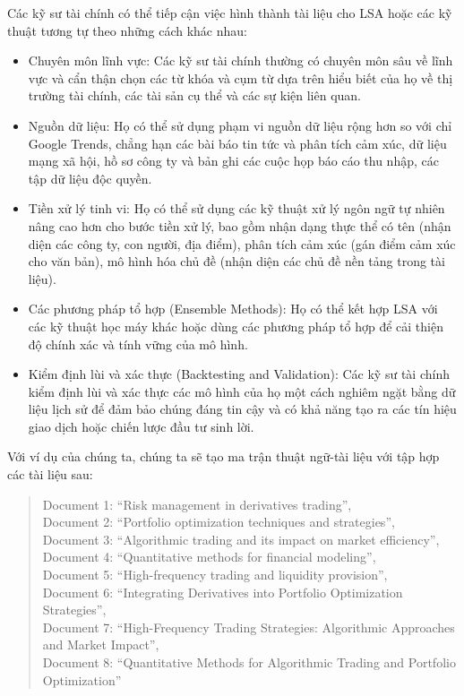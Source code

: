 Các kỹ sư tài chính có thể tiếp cận việc hình thành tài liệu cho LSA hoặc các kỹ thuật tương tự theo những cách khác nhau:

\begin{itemize}
  \item Chuyên môn lĩnh vực: Các kỹ sư tài chính thường có chuyên môn sâu về lĩnh vực và cẩn thận chọn các từ khóa và cụm từ dựa trên hiểu biết của họ về thị trường tài chính, các tài sản cụ thể và các sự kiện liên quan.

  \item Nguồn dữ liệu: Họ có thể sử dụng phạm vi nguồn dữ liệu rộng hơn so với chỉ Google Trends, chẳng hạn các bài báo tin tức và phân tích cảm xúc, dữ liệu mạng xã hội, hồ sơ công ty và bản ghi các cuộc họp báo cáo thu nhập, các tập dữ liệu độc quyền.

  \item Tiền xử lý tinh vi: Họ có thể sử dụng các kỹ thuật xử lý ngôn ngữ tự nhiên nâng cao hơn cho bước tiền xử lý, bao gồm nhận dạng thực thể có tên (nhận diện các công ty, con người, địa điểm), phân tích cảm xúc (gán điểm cảm xúc cho văn bản), mô hình hóa chủ đề (nhận diện các chủ đề nền tảng trong tài liệu).

  \item Các phương pháp tổ hợp (Ensemble Methods): Họ có thể kết hợp LSA với các kỹ thuật học máy khác hoặc dùng các phương pháp tổ hợp để cải thiện độ chính xác và tính vững của mô hình.

  \item Kiểm định lùi và xác thực (Backtesting and Validation): Các kỹ sư tài chính kiểm định lùi và xác thực các mô hình của họ một cách nghiêm ngặt bằng dữ liệu lịch sử để đảm bảo chúng đáng tin cậy và có khả năng tạo ra các tín hiệu giao dịch hoặc chiến lược đầu tư sinh lời.
\end{itemize}

Với ví dụ của chúng ta, chúng ta sẽ tạo ma trận thuật ngữ-tài liệu với tập hợp các tài liệu sau:

\begin{quote}
Document 1: ``Risk management in derivatives trading'', \\
Document 2: ``Portfolio optimization techniques and strategies'', \\
Document 3: ``Algorithmic trading and its impact on market efficiency'', \\
Document 4: ``Quantitative methods for financial modeling'', \\
Document 5: ``High-frequency trading and liquidity provision'', \\
Document 6: ``Integrating Derivatives into Portfolio Optimization Strategies'', \\
Document 7: ``High-Frequency Trading Strategies: Algorithmic Approaches and Market Impact'', \\
Document 8: ``Quantitative Methods for Algorithmic Trading and Portfolio Optimization''
\end{quote}

